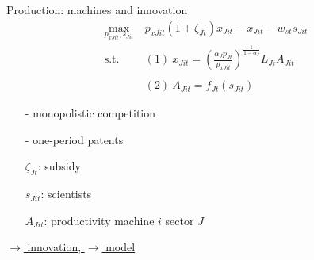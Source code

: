 \documentclass[11pt,aspectratio=169]{beamer}
\begin{document}
	\begin{frame}{Production: machines and innovation}
		\hypertarget{modma}{}
		\vspace{0mm}
		\begin{align*}
			\underset{p_{xJit}, s_{Jit}}{\max}\ & p_{xJit}(1+\zeta_{Jt})x_{Jit}-x_{Jit}-w_{st}s_{Jit}
			\\ 
			\text{s.t.}\ &(1)\ x_{Jit}=\left(\frac{\alpha_Jp_{Jt}}{p_{xJit}}\right)^{\frac{1}{1-\alpha_J}}L_{Jt}A_{Jit}\\ \ \\ %
			& (2)\ A_{Jit}=f_{Jt}(s_{Jit})%
		\end{align*}
		
		\small
		\vspace{6mm}
		\hspace{-4mm}	\begin{minipage}[t!]{0.32\textwidth}
			\vspace{0mm}
			\begin{itemize}
				\item[-] monopolistic competition 
				\vspace{-4mm}
				\item[-] one-period patents
			\end{itemize}	
		\end{minipage}
		\begin{minipage}[t!]{0.5\textwidth}
			\vspace{0mm}
			\begin{itemize}	
				\item[]$\zeta_{Jt}$: subsidy
				\vspace{-2mm}	
				\item[]$s_{Jit}$: scientists
				\vspace{-2mm}	
				\item[]$A_{Jit}$: productivity machine $i$ sector $J$
			\end{itemize}
		\end{minipage}
		
		\vspace{0mm}
		\hfill \hyperlink{backinnov}{\tiny{$\rightarrow$ innovation, \hyperlink{backScheme}{\tiny{$\rightarrow$ model}}}}
	\end{frame}	
		
\end{document}
